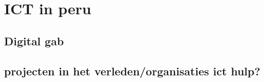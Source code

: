 \section{ICT in peru}
\subsection{Digital gab}
\subsection{projecten in het verleden/organisaties ict hulp?}

